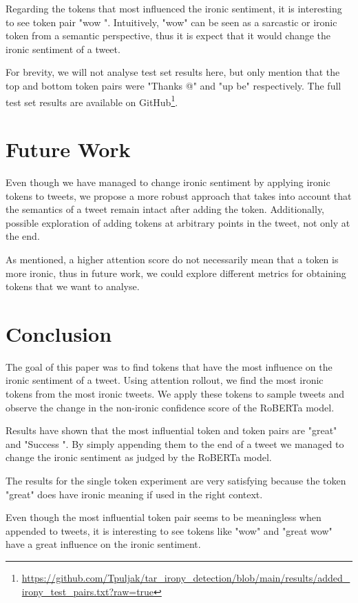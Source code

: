 \documentclass[10pt, a4paper]{article}
\begin{document}
Regarding the tokens that most influenced the ironic sentiment, it is interesting to see token pair "wow \textvisiblespace ".
Intuitively, "wow" can be seen as a sarcastic or ironic token from a semantic perspective, thus it is expect that it would change the ironic sentiment of a tweet.

For brevity, we will not analyse test set results here, but only mention that the top and bottom token pairs were "Thanks @" and "up be" respectively.
The full test set results are available on GitHub\footnote{\url{https://github.com/Tpuljak/tar_irony_detection/blob/main/results/added_irony_test_pairs.txt?raw=true}}.

\section{Future Work}

Even though we have managed to change ironic sentiment by applying ironic tokens to tweets, we propose a more robust approach that takes into account that the semantics of a tweet remain intact after adding the token.
Additionally, possible exploration of adding tokens at arbitrary points in the tweet, not only at the end.

As mentioned, a higher attention score do not necessarily mean that a token is more ironic, thus in future work, we could explore different metrics for obtaining tokens that we want to analyse.

\section{Conclusion}

The goal of this paper was to find tokens that have the most influence on the ironic sentiment of a tweet.
Using attention rollout, we find the most ironic tokens from the most ironic tweets.
We apply these tokens to sample tweets and observe the change in the non-ironic confidence score of the RoBERTa model.

Results have shown that the most influential token and token pairs are "great" and "Success \textvisiblespace ".
By simply appending them to the end of a tweet we managed to change the ironic sentiment as judged by the RoBERTa model.

The results for the single token experiment are very satisfying because the token "great" does have ironic meaning if used in the right context.

Even though the most influential token pair seems to be meaningless when appended to tweets, it is interesting to see tokens like "wow" and "great wow" have a great influence on the ironic sentiment.


 
\end{document}
